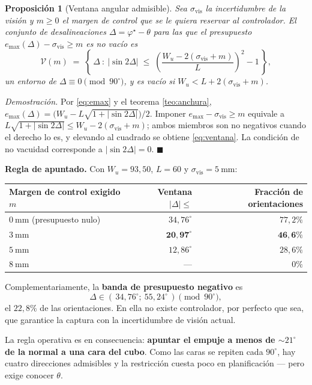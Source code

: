 \documentclass[11pt,a4paper]{article}
\newtheorem{proposicion}[teorema]{Proposición}
\theoremstyle{definition}
\newenvironment{demo}{\par\noindent\textit{Demostración.}\;}{\hfill$\blacksquare$\par\medskip}
\newcommand{\grados}{^{\circ}}
\begin{document}
\begin{proposicion}[Ventana angular admisible]
\label{prop:ventana}
Sea $\sigma_{\mathrm{vis}}$ la incertidumbre de la visión y $m\ge 0$ el margen de control
que se le quiera reservar al controlador. El conjunto de desalineaciones
$\Delta = \varphi^\star - \theta$ para las que el presupuesto
$e_{\max}(\Delta) - \sigma_{\mathrm{vis}} \ge m$ es no vacío es
\begin{equation}
  \mathcal V(m) \;=\; \left\{\, \Delta \ :\
  \big|\sin 2\Delta\big| \;\le\;
  \left(\frac{W_u - 2(\sigma_{\mathrm{vis}} + m)}{L}\right)^{\!2} - 1 \,\right\},
  \label{eq:ventana}
\end{equation}
un entorno de $\Delta \equiv 0 \pmod{90\grados}$, y es vacío si
$W_u < L + 2(\sigma_{\mathrm{vis}}+m)$.
\end{proposicion}

\begin{demo}
Por \eqref{eq:emax} y el teorema \ref{teo:anchura},
$e_{\max}(\Delta) = \big(W_u - L\sqrt{1+|\sin 2\Delta|}\big)/2$. Imponer
$e_{\max} - \sigma_{\mathrm{vis}} \ge m$ equivale a
$L\sqrt{1+|\sin2\Delta|} \le W_u - 2(\sigma_{\mathrm{vis}}+m)$; ambos miembros son no
negativos cuando el derecho lo es, y elevando al cuadrado se obtiene \eqref{eq:ventana}.
La condición de no vacuidad corresponde a $|\sin2\Delta| = 0$.
\end{demo}

\begin{resultado}
\textbf{Regla de apuntado.} Con $W_u = 93{,}50$, $L = 60$ y
$\sigma_{\mathrm{vis}} = 5\ \mathrm{mm}$:
\begin{center}
\begin{tabular}{lrr}
\toprule
Margen de control exigido $m$ & Ventana $|\Delta| \le$ & Fracción de orientaciones \\
\midrule
$0\ \mathrm{mm}$ (presupuesto nulo) & $34{,}76\grados$ & $77{,}2\%$ \\
$3\ \mathrm{mm}$ & $\mathbf{20{,}97\grados}$ & $\mathbf{46{,}6\%}$ \\
$5\ \mathrm{mm}$ & $12{,}86\grados$ & $28{,}6\%$ \\
$8\ \mathrm{mm}$ & --- & $0\%$ \\
\bottomrule
\end{tabular}
\end{center}
Complementariamente, la \textbf{banda de presupuesto negativo} es
\[
  \Delta \in (\,34{,}76\grados;\ 55{,}24\grados\,) \pmod{90\grados},
\]
el $22{,}8\%$ de las orientaciones. En ella no existe controlador, por perfecto que sea,
que garantice la captura con la incertidumbre de visión actual.

\smallskip
La regla operativa es en consecuencia: \textbf{apuntar el empuje a menos de
$\sim\!21\grados$ de la normal a una cara del cubo}. Como las caras se repiten cada
$90\grados$, hay cuatro direcciones admisibles y la restricción cuesta poco en
planificación --- pero exige conocer $\theta$.
\end{resultado}
\end{document}
